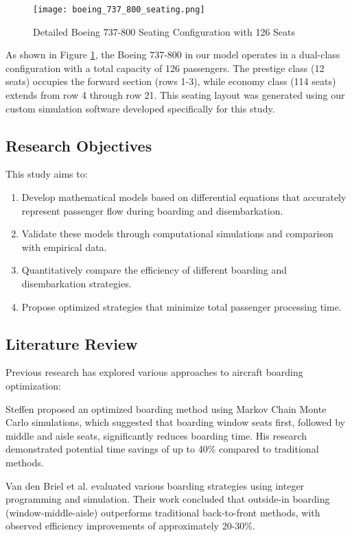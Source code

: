\documentclass[12pt,a4paper]{article}
\begin{document}
\begin{figure}[H]
\centering
\texttt{[image: boeing\_737\_800\_seating.png]}
\caption{Detailed Boeing 737-800 Seating Configuration with 126 Seats}
\label{fig:seating_diagram}
\end{figure}

As shown in Figure \ref{fig:seating_diagram}, the Boeing 737-800 in our model operates in a dual-class configuration with a total capacity of 126 passengers. The prestige class (12 seats) occupies the forward section (rows 1-3), while economy class (114 seats) extends from row 4 through row 21. This seating layout was generated using our custom simulation software developed specifically for this study.

\subsection{Research Objectives}
This study aims to:
\begin{enumerate}
    \item Develop mathematical models based on differential equations that accurately represent passenger flow during boarding and disembarkation.
    \item Validate these models through computational simulations and comparison with empirical data.
    \item Quantitatively compare the efficiency of different boarding and disembarkation strategies.
    \item Propose optimized strategies that minimize total passenger processing time.
\end{enumerate}

\subsection{Literature Review}
Previous research has explored various approaches to aircraft boarding optimization:

Steffen \cite{steffen2008} proposed an optimized boarding method using Markov Chain Monte Carlo simulations, which suggested that boarding window seats first, followed by middle and aisle seats, significantly reduces boarding time. His research demonstrated potential time savings of up to 40\% compared to traditional methods.

Van den Briel et al. \cite{vandenbriel2005} evaluated various boarding strategies using integer programming and simulation. Their work concluded that outside-in boarding (window-middle-aisle) outperforms traditional back-to-front methods, with observed efficiency improvements of approximately 20-30\%.
\end{document}
